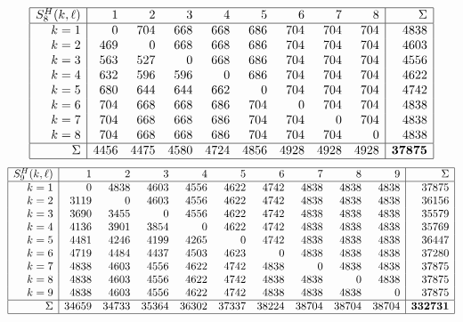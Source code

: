 \documentclass[11pt]{amsart}
\theoremstyle{definition}
\begin{document}
\[ \begin{array}{|r|rrrrrrrr|r|}
\hline
S^H_{8}(k, \ell)
& 1 & 2 & 3 & 4 & 5 & 6 & 7 & 8 & \Sigma \\ \hline
k= 1 & 0 & 704 & 668 & 668 & 686 & 704 & 704 & 704 & 4838 \\
k= 2 & 469 & 0 & 668 & 668 & 686 & 704 & 704 & 704 & 4603 \\
k= 3 & 563 & 527 & 0 & 668 & 686 & 704 & 704 & 704 & 4556 \\
k= 4 & 632 & 596 & 596 & 0 & 686 & 704 & 704 & 704 & 4622 \\
k= 5 & 680 & 644 & 644 & 662 & 0 & 704 & 704 & 704 & 4742 \\
k= 6 & 704 & 668 & 668 & 686 & 704 & 0 & 704 & 704 & 4838 \\
k= 7 & 704 & 668 & 668 & 686 & 704 & 704 & 0 & 704 & 4838 \\
k= 8 & 704 & 668 & 668 & 686 & 704 & 704 & 704 & 0 & 4838 \\
\hline
\Sigma & 4456 & 4475 & 4580 & 4724 & 4856 & 4928 & 4928 & 4928 & \mathbf{37875}
\\ \hline
\end{array}
\]
{\scriptsize
\[ \begin{array}{|r|rrrrrrrrr|r|}
\hline
S^H_{9}(k, \ell)
& 1 & 2 & 3 & 4 & 5 & 6 & 7 & 8 & 9 & \Sigma \\ \hline
k= 1 & 0 & 4838 & 4603 & 4556 & 4622 & 4742 & 4838 & 4838 & 4838 & 37875 \\
k= 2 & 3119 & 0 & 4603 & 4556 & 4622 & 4742 & 4838 & 4838 & 4838 & 36156 \\
k= 3 & 3690 & 3455 & 0 & 4556 & 4622 & 4742 & 4838 & 4838 & 4838 & 35579 \\
k= 4 & 4136 & 3901 & 3854 & 0 & 4622 & 4742 & 4838 & 4838 & 4838 & 35769 \\
k= 5 & 4481 & 4246 & 4199 & 4265 & 0 & 4742 & 4838 & 4838 & 4838 & 36447 \\
k= 6 & 4719 & 4484 & 4437 & 4503 & 4623 & 0 & 4838 & 4838 & 4838 & 37280 \\
k= 7 & 4838 & 4603 & 4556 & 4622 & 4742 & 4838 & 0 & 4838 & 4838 & 37875 \\
k= 8 & 4838 & 4603 & 4556 & 4622 & 4742 & 4838 & 4838 & 0 & 4838 & 37875 \\
k= 9 & 4838 & 4603 & 4556 & 4622 & 4742 & 4838 & 4838 & 4838 & 0 & 37875 \\
\hline
\Sigma & 34659 & 34733 & 35364 & 36302 & 37337 & 38224 & 38704 & 38704 & 38704 & \mathbf{332731}
\\ \hline
\end{array}
\] }
\end{document}
